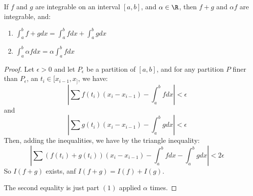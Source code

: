 \begin{theorem}[Linearity]\label{5.2.2}
    If $f$ and  $g$ are integrable on an interval  $[a,b]$, and  $\alpha \in
    \R$, then $f+g$ and  $\alpha f$ are integrable, and:
        \begin{enumerate}[label=(\arabic*)]
            \item $\int_{a}^{b}{f+g dx}=\int_{a}^{b}{f dx}+\int_{a}^{b}{g dx}$

            \item $\int_{a}^{b}{\alpha f dx}=\alpha\int_{a}^{b}{f dx}$ 
        \end{enumerate}
\end{theorem}
\begin{proof}
    Let $\epsilon>0$ and let $P_{\epsilon}$ be a partition of  $[a,b]$, and for
    any partition  $P$ finer than  $P_{\epsilon}$, an  $t_i \in [x_{i-1},x_]$,
    we have:
        \begin{equation*}
            |\sum{f(t_i)(x_i-x_{i-1})}-\int_{a}^{b}{f dx}|<\epsilon           
        \end{equation*}
    and
        \begin{equation*}
            |\sum{g(t_i)(x_i-x_{i-1})}-\int_{a}^{b}{g dx}|<\epsilon
        \end{equation*}
    Then, adding the inequalities, we have by the triangle inequality:
        \begin{equation*}
            |\sum{(f(t_i)+g(t_i))(x_i-x_{i-1})}-\int_{a}^{b}{f
            dx}-\int_{a}^{b}{g dx}|<2\epsilon
        \end{equation*}
    So $I(f+g)$ exists, anf  $I(f+g)=I(f)+I(g)$.

    The second equality is just part $(1)$ applied $\alpha$ times.
\end{proof}

